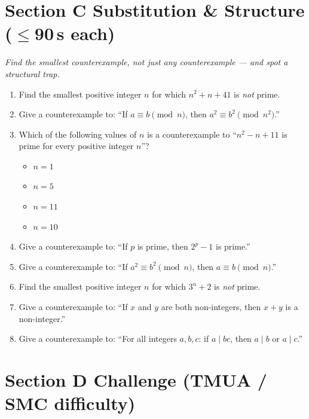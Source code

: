 \documentclass[11pt,a4paper]{article}
\begin{document}
\section*{Section C \quad Substitution \& Structure \hfill{\normalfont\small($\leq$90\,s each)}}

\noindent\textit{Find the smallest counterexample, not just any counterexample --- and spot a structural trap.}

\begin{enumerate}

\item Find the smallest positive integer $n$ for which $n^2+n+41$ is \emph{not} prime.

\item Give a counterexample to: ``If $a \equiv b \pmod n$, then $a^2 \equiv b^2 \pmod{n^2}$.''

\item Which of the following values of $n$ is a counterexample to ``$n^2-n+11$ is prime for every positive integer $n$''?
\begin{itemize}
\item[A)] $n=1$
\item[B)] $n=5$
\item[C)] $n=11$
\item[D)] $n=10$
\end{itemize}

\item Give a counterexample to: ``If $p$ is prime, then $2^p-1$ is prime.''

\item Give a counterexample to: ``If $a^2 \equiv b^2 \pmod n$, then $a \equiv b \pmod n$.''

\item Find the smallest positive integer $n$ for which $3^n+2$ is \emph{not} prime.

\item Give a counterexample to: ``If $x$ and $y$ are both non-integers, then $x+y$ is a non-integer.''

\item Give a counterexample to: ``For all integers $a,b,c$: if $a \mid bc$, then $a \mid b$ or $a \mid c$.''

\end{enumerate}

\section*{Section D \quad Challenge \hfill{\normalfont\small(TMUA / SMC difficulty)}}
\end{document}
